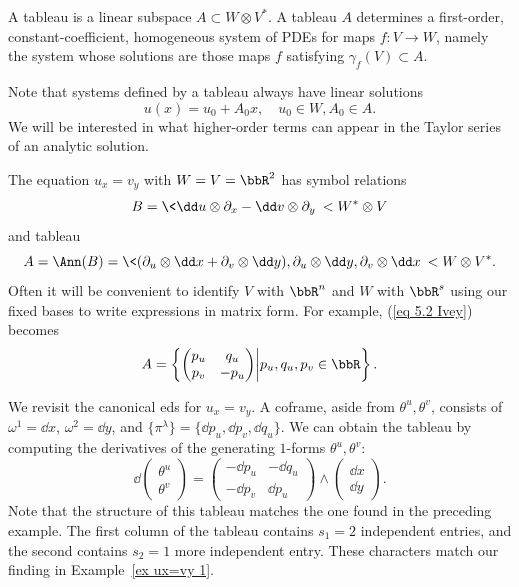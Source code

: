 \begin{defn}[Tableau]
    A tableau is a linear subspace $A\subset W\otimes V^\ast$. A tableau $A$ determines a first-order, constant-coefficient, homogeneous system of PDEs for maps $f:V\to W$, namely the system whose solutions are those maps $f$ satisfying $\gamma_f(V)\subset A$.
\end{defn}

Note that systems defined by a tableau always have linear solutions 
\[u(x)=u_0+A_0x,\quad u_0\in W,A_0\in A.\] 
We will be interested in what higher-order terms can appear in the Taylor series of an analytic solution.

\begin{example}
    The equation $u_x=v_y$ with $W=V=\bbR^2$ has symbol relations 
    \[B=\<\dd u\otimes \partial_{x}-\dd v\otimes \partial_{y}\>< W^\ast\otimes V\]
    and tableau 
    \[A=\Ann(B)=\<(\partial_{u}\otimes \dd x+\partial_{v}\otimes\dd y),\partial_{u}\otimes \dd y,\partial_{v}\otimes \dd x\>< W\otimes V^\ast.\label{eq 5.2 Ivey}\]
    Often it will be convenient to identify $V$ with $\bbR^n$ and $W$ with $\bbR^s$ using our fixed bases to write expressions in matrix form. For example, (\ref{eq 5.2 Ivey}) becomes 
    \[A=\left\{
    \begin{pmatrix}
        p_u&q_u\\p_v&-p_u
    \end{pmatrix}\middle| p_u,q_u,p_v\in\bbR
\right\}.\]
\end{example}

\begin{example}[\ref{ex ux=vy 1} continued]
    We revisit the canonical \gls{eds} for $u_x=v_y$. A coframe, aside from $\theta^u,\theta^v$, consists of $\omega^1=\dd x$, $\omega^2=\dd y$, and $\{\pi^\lambda\}=\{\dd p_u,\dd p_v,\dd q_u\}$. We can obtain the tableau by computing the derivatives of the generating $1$-forms $\theta^u,\theta^v$:
    \[\dd \begin{pmatrix}
        \theta^u\\\theta^v
    \end{pmatrix}=
    \begin{pmatrix}
        -\dd p_u & -\dd q_u\\
        -\dd p_v & \dd p_u
    \end{pmatrix}\wedge 
    \begin{pmatrix}
        \dd x\\ \dd y
    \end{pmatrix}.
    \]
    Note that the structure of this tableau matches the one found in the preceding example.
    The first column of the tableau contains $s_1=2$ independent entries, and the second contains $s_2=1$ more independent entry. These characters match our finding in Example~\ref{ex ux=vy 1}.
\end{example}


